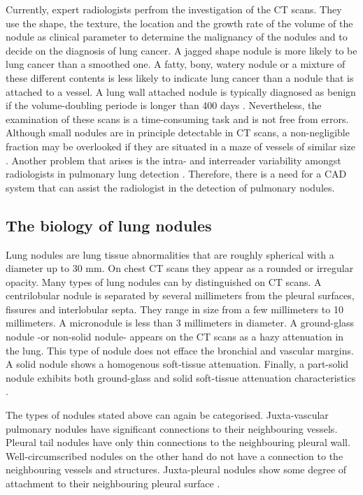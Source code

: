 Currently, expert radiologists perfrom the investigation of the
CT scans. They use the shape, the texture, the location and the growth rate of
the volume of the nodule as clinical parameter to determine the malignancy of
the nodules and to decide on the diagnosis of lung cancer. A jagged shape
nodule is more likely to be lung cancer than a smoothed one. A fatty, bony,
watery nodule or a mixture of these different contents is less likely to
indicate lung cancer than a nodule that is attached to a vessel. A lung wall
attached nodule is typically diagnosed as benign if the volume-doubling periode
is longer than 400 days \cite{wu}. Nevertheless, the examination of these scans
is a time-consuming task and is not free from errors. Although small nodules are
in principle detectable in CT scans, a non-negligible fraction may be overlooked
if they are situated in a maze of vessels of similar size \cite{ozekes}. Another
problem that arises is the intra- and interreader variability amongst
radiologists in pulmonary lung detection \cite{armato} \cite{hens}. Therefore,
there is a need for a CAD system that can assist the radiologist in the
detection of pulmonary nodules.

\subsection{The biology of lung nodules}
Lung nodules are lung tissue abnormalities that are roughly spherical with a
diameter up to 30 mm. On chest CT scans they appear as a rounded or
irregular opacity. Many types of lung nodules can by distinguished on CT scans.
A centrilobular nodule is separated by several millimeters from the pleural surfaces, fissures and
interlobular septa. They range in size from a few millimeters to 10 millimeters.
A micronodule is less than 3 millimeters in diameter. A ground-glass nodule -or
non-solid nodule- appears on the CT scans as a hazy attenuation in the lung.
This type of nodule does not efface the bronchial and vascular margins. A solid
nodule shows a homogenous soft-tissue attenuation. Finally, a part-solid nodule
exhibits both ground-glass and solid soft-tissue attenuation characteristics
\cite{nodule}. 

The types of nodules stated above can again be categorised. Juxta-vascular
pulmonary nodules have significant connections to their neighbouring vessels.
Pleural tail nodules have only thin connections to the neighbouring pleural
wall. Well-circumscribed nodules on the other hand do not have a connection to
the neighbouring vessels and structures. Juxta-pleural nodules show some degree
of attachment to their neighbouring pleural surface \cite{kostis}.

